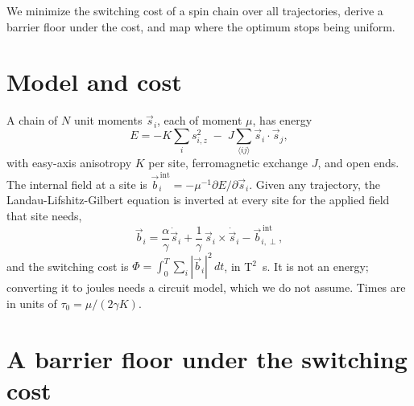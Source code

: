 \documentclass[11pt]{article}
\begin{document}
We minimize the switching cost of a spin chain over all trajectories, derive a barrier floor under the
cost, and map where the optimum stops being uniform.

\section{Model and cost}

A chain of $N$ unit moments $\vec s_i$, each of moment $\mu$, has energy
\begin{equation}
E = -K \sum_i s_{i,z}^2 \;-\; J \sum_{\langle ij\rangle} \vec s_i \cdot \vec s_j ,
\end{equation}
with easy-axis anisotropy $K$ per site, ferromagnetic exchange $J$, and open ends. The internal field
at a site is $\vec b^{\,\mathrm{int}}_i = -\mu^{-1}\partial E/\partial \vec s_i$. Given any trajectory,
the Landau-Lifshitz-Gilbert equation is inverted at every site for the applied field that site needs,
\begin{equation}
\vec b_i = \frac{\alpha}{\gamma}\dot{\vec s}_i + \frac{1}{\gamma}\,\vec s_i\times\dot{\vec s}_i
- \vec b^{\,\mathrm{int}}_{i,\perp},
\label{eq:inverse}
\end{equation}
and the switching cost is $\Phi = \int_0^T \sum_i |\vec b_i|^2\,dt$, in T$^2$~s. It is not an energy;
converting it to joules needs a circuit model, which we do not assume. Times are in units of
$\tau_0 = \mu/(2\gamma K)$.

\section{A barrier floor under the switching cost}
\label{sec:floor}
\end{document}
